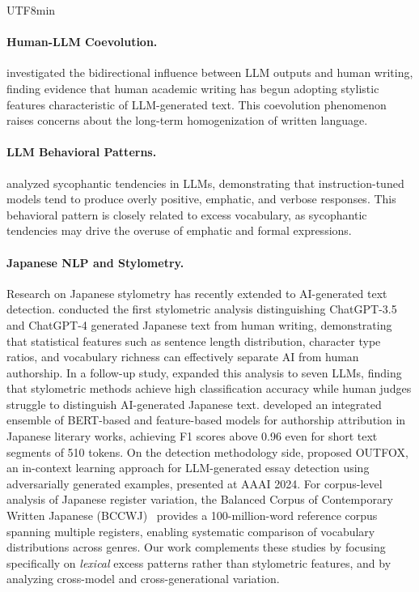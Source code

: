 \documentclass[11pt,a4paper]{article}
\begin{document}
\begin{CJK}{UTF8}{min}
\paragraph{Human-LLM Coevolution.}
\citet{arrigo2025coevolution} investigated the bidirectional influence between LLM outputs and human writing, finding evidence that human academic writing has begun adopting stylistic features characteristic of LLM-generated text. This coevolution phenomenon raises concerns about the long-term homogenization of written language.

\paragraph{LLM Behavioral Patterns.}
\citet{malmqvist2024sycophancy} analyzed sycophantic tendencies in LLMs, demonstrating that instruction-tuned models tend to produce overly positive, emphatic, and verbose responses. This behavioral pattern is closely related to excess vocabulary, as sycophantic tendencies may drive the overuse of emphatic and formal expressions.

\paragraph{Japanese NLP and Stylometry.}
Research on Japanese stylometry has recently extended to AI-generated text detection. \citet{zaitsu2023chatgpt} conducted the first stylometric analysis distinguishing ChatGPT-3.5 and ChatGPT-4 generated Japanese text from human writing, demonstrating that statistical features such as sentence length distribution, character type ratios, and vocabulary richness can effectively separate AI from human authorship. In a follow-up study, \citet{zaitsu2025stylometry} expanded this analysis to seven LLMs, finding that stylometric methods achieve high classification accuracy while human judges struggle to distinguish AI-generated Japanese text. \citet{kanda2025ensemble} developed an integrated ensemble of BERT-based and feature-based models for authorship attribution in Japanese literary works, achieving F1 scores above 0.96 even for short text segments of 510 tokens. On the detection methodology side, \citet{koike2024outfox} proposed OUTFOX, an in-context learning approach for LLM-generated essay detection using adversarially generated examples, presented at AAAI 2024. For corpus-level analysis of Japanese register variation, the Balanced Corpus of Contemporary Written Japanese (BCCWJ)~\citep{maekawa2014bccwj} provides a 100-million-word reference corpus spanning multiple registers, enabling systematic comparison of vocabulary distributions across genres. Our work complements these studies by focusing specifically on \emph{lexical} excess patterns rather than stylometric features, and by analyzing cross-model and cross-generational variation.


\end{CJK}
\end{document}
